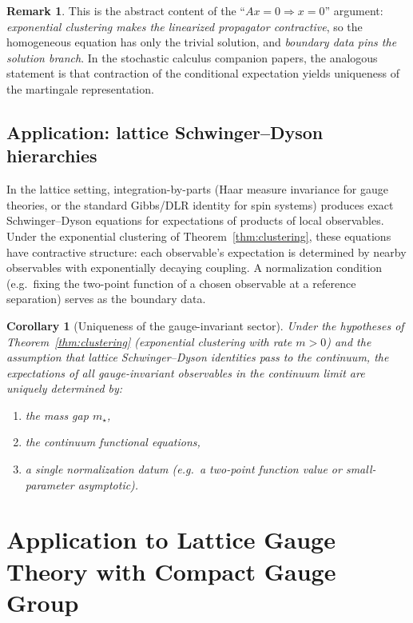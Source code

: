 \documentclass[11pt]{article}
\newtheorem{corollary}[theorem]{Corollary}
\theoremstyle{definition}
\newtheorem{remark}[theorem]{Remark}
\newcommand{\1}{\mathbf{1}}
\begin{document}
\begin{remark}
This is the abstract content of the ``$Ax=0\Rightarrow x=0$'' argument:
\emph{exponential clustering makes the linearized propagator contractive},
so the homogeneous equation has only the trivial solution,
and \emph{boundary data pins the solution branch}.
In the stochastic calculus companion papers, the analogous statement is that
contraction of the conditional expectation yields uniqueness of the
martingale representation.
\end{remark}

\subsection{Application: lattice Schwinger--Dyson hierarchies}

In the lattice setting, integration-by-parts (Haar measure invariance for gauge theories,
or the standard Gibbs/DLR identity for spin systems) produces exact Schwinger--Dyson
equations for expectations of products of local observables.  Under the exponential clustering
of Theorem~\ref{thm:clustering}, these equations have contractive structure: each
observable's expectation is determined by nearby observables with exponentially decaying
coupling.  A normalization condition (e.g.\ fixing the two-point function of a chosen
observable at a reference separation) serves as the boundary data.

\begin{corollary}[Uniqueness of the gauge-invariant sector]\label{cor:uniqueness}
Under the hypotheses of Theorem~\ref{thm:clustering} (exponential clustering with rate $m>0$)
and the assumption that lattice Schwinger--Dyson identities pass to the continuum, the
expectations of all gauge-invariant observables in the continuum limit are uniquely determined
by:
\begin{enumerate}[label=(\alph*)]
\item the mass gap $m_\star$,
\item the continuum functional equations,
\item a single normalization datum (e.g.\ a two-point function value or small-parameter
asymptotic).
\end{enumerate}
\end{corollary}

\section{Application to Lattice Gauge Theory with Compact Gauge Group}\label{sec:application}
\end{document}
